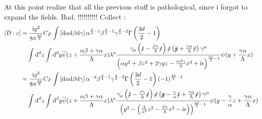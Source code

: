 At this point realize that all the previous stuff is pathological, since i forgot to expand the fields. Bad. !!!!!!!!!!
Collect :
\begin{align}
	\left[D:c\right]&=
	\frac{\text{i} g^2}{8\pi^{\frac{3d}{2}}} C_F \int\left[\text{d} \alpha \text{d} \beta \text{d} \gamma\right]\alpha^{\frac{d}{2}-1}\beta^{\frac{d}{2}-1}\gamma^{\frac{d}{2}-2}\Gamma\left(\frac{3d}{2}-1\right) 
	\\&~~~
	\int \text{d}^d z \int \text{d}^d y \overline\psi(z+ \frac{\alpha \beta + \gamma \alpha}{\Lambda} x) \lambda^a \frac{\gamma_\mu \left( \slashed z - \frac{\beta\gamma}{\Lambda} \slashed x\right) \slashed x \left( \slashed y + \frac{\gamma\alpha}{\Lambda}\slashed x\right)\gamma^\mu }{\left( \alpha y^2 + \beta z^2 + 2\gamma yz -\frac{\alpha\beta\gamma}{\Lambda} x^2 + \text{i} \epsilon \right)^{\frac{3d}{2}-1}}\psi(y+ \frac{\gamma \alpha}{\Lambda} x)
	\\
	&=
	\frac{\text{i} g^2}{8\pi^{\frac{3d}{2}}} C_F \int\left[\text{d} \alpha \text{d} \beta \text{d} \gamma\right]\alpha^{-d}\beta^{\frac{d}{2}-1}\gamma^{\frac{d}{2}-2}\Gamma\left(\frac{3d}{2}-1\right) (-1)^{\frac{3d}{2}-1}
	\\&~~~
	\int \text{d}^d z \int \text{d}^d y \overline\psi(z+ \frac{\alpha \beta + \gamma \alpha}{\Lambda} x) \lambda^a \frac{\gamma_\mu \left( \slashed z - \frac{\beta\gamma}{\Lambda} \slashed x\right) \slashed x \left( \slashed y - \frac{\gamma}{\alpha} \slashed z+ \frac{\gamma\alpha}{\Lambda}\slashed x\right)\gamma^\mu }{\left( y^2 - \left( \frac{\Lambda}{\alpha^2}z^2- \frac{\beta\gamma}{\Lambda}x^2-\text{i} \epsilon\right)\right)^{\frac{3d}{2}-1}}\psi(y - \frac{\gamma}{\alpha}z+ \frac{\gamma \alpha}{\Lambda} x)
\end{align}


